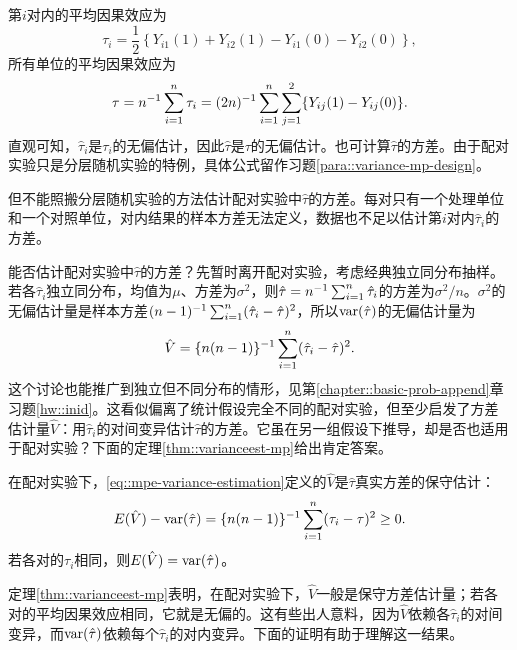 第$i$对内的平均因果效应为
$$
 \tau_i = \frac{1}{2}  \left\{    Y_{i1}(1) + Y_{i2}(1) -     Y_{i1}(0)  - Y_{i2}(0)     \right\},
 $$
所有单位的平均因果效应为
$$
\tau = n^{-1} \sum_{i=1}^n  \tau_i  = (2n)^{-1} \sum_{i=1}^n \sum_{j=1}^2 \{  Y_{ij}(1) - Y_{ij}(0)   \} .
$$
直观可知，$\hat{\tau}_i $是$ \tau_i $的无偏估计，因此$\hat{\tau}  $是$\tau$的无偏估计。也可计算$\hat{\tau}  $的方差。由于配对实验只是分层随机实验的特例，具体公式留作习题\ref{para::variance-mp-design}。 


但不能照搬分层随机实验的方法估计配对实验中$\hat{\tau}  $的方差。每对只有一个处理单位和一个对照单位，对内结果的样本方差无法定义，数据也不足以估计第$i$对内$\hat{\tau}_i $的方差。  


能否估计配对实验中$\hat{\tau}$的方差？先暂时离开配对实验，考虑经典独立同分布抽样。若各$\hat{\tau}_i$独立同分布，均值为$\mu$、方差为$\sigma^2$，则$\hat{\tau} = n^{-1} \sum_{i=1}^n \hat{\tau}_i$的方差为$\sigma^2 / n$。$\sigma^2$的无偏估计量是样本方差$(n-1)^{-1} \sum_{i=1}^n ( \hat{\tau}_i -  \hat{\tau} )^2$，所以$\textup{var}( \hat{\tau}  )$的无偏估计量为
\begin{equation}\label{eq::mpe-variance-estimation}
\hat{V} = \{ n(n-1)  \}^{-1} \sum_{i=1}^n ( \hat{\tau}_i -  \hat{\tau} )^2.
\end{equation}
这个讨论也能推广到独立但不同分布的情形，见第\ref{chapter::basic-prob-append}章习题\ref{hw::inid}。这看似偏离了统计假设完全不同的配对实验，但至少启发了方差估计量$\hat{V} $：用$\hat{\tau}_i $的对间变异估计$\hat{\tau}  $的方差。它虽在另一组假设下推导，却是否也适用于配对实验？下面的定理\ref{thm::varianceest-mp}给出肯定答案。
 
\begin{theorem}\label{thm::varianceest-mp}
在配对实验下，\eqref{eq::mpe-variance-estimation}定义的$\hat{V}$是$\hat{\tau}  $真实方差的保守估计：
$$
E(  \hat{V}) - \textup{var}(   \hat{\tau}  ) = \{ n(n-1)  \}^{-1} \sum_{i=1}^n  (\tau_i - \tau)^2 \geq 0  .
$$
若各对的$\tau_i$相同，则$E(  \hat{V} )  = \textup{var}(\hat{\tau})$。
\end{theorem}


定理\ref{thm::varianceest-mp}表明，在配对实验下，$\hat{V} $一般是保守方差估计量；若各对的平均因果效应相同，它就是无偏的。这有些出人意料，因为$\hat{V} $依赖各$ \hat{\tau}_i $的对间变异，而$ \textup{var}(   \hat{\tau}  ) $依赖每个$ \hat{\tau}_i $的对内变异。下面的证明有助于理解这一结果。 
 
 


